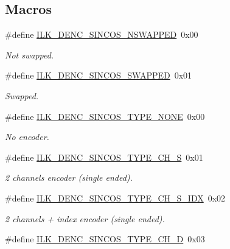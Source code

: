 \subsection*{Macros}
\begin{DoxyCompactItemize}
\item 
\#define \hyperlink{group__IL__CONST__DENC__SINCOS__PARAM_gab022f184ba8cf874ef8721e8abe09c77}{I\+L\+K\+\_\+\+D\+E\+N\+C\+\_\+\+S\+I\+N\+C\+O\+S\+\_\+\+N\+S\+W\+A\+P\+P\+ED}~0x00
\begin{DoxyCompactList}\small\item\em Not swapped. \end{DoxyCompactList}\item 
\#define \hyperlink{group__IL__CONST__DENC__SINCOS__PARAM_ga6dffe9e93f3ca75469f7a06a0c30698e}{I\+L\+K\+\_\+\+D\+E\+N\+C\+\_\+\+S\+I\+N\+C\+O\+S\+\_\+\+S\+W\+A\+P\+P\+ED}~0x01
\begin{DoxyCompactList}\small\item\em Swapped. \end{DoxyCompactList}\item 
\#define \hyperlink{group__IL__CONST__DENC__SINCOS__PARAM_ga41502cd69c22253c445453a996abda64}{I\+L\+K\+\_\+\+D\+E\+N\+C\+\_\+\+S\+I\+N\+C\+O\+S\+\_\+\+T\+Y\+P\+E\+\_\+\+N\+O\+NE}~0x00
\begin{DoxyCompactList}\small\item\em No encoder. \end{DoxyCompactList}\item 
\#define \hyperlink{group__IL__CONST__DENC__SINCOS__PARAM_ga97bc5306fab0925635bf69eb06d5535f}{I\+L\+K\+\_\+\+D\+E\+N\+C\+\_\+\+S\+I\+N\+C\+O\+S\+\_\+\+T\+Y\+P\+E\+\_\+C\+H\+\_\+S}~0x01
\begin{DoxyCompactList}\small\item\em 2 channels encoder (single ended). \end{DoxyCompactList}\item 
\#define \hyperlink{group__IL__CONST__DENC__SINCOS__PARAM_ga8520f2c6591863e2f7edc711b53f459e}{I\+L\+K\+\_\+\+D\+E\+N\+C\+\_\+\+S\+I\+N\+C\+O\+S\+\_\+\+T\+Y\+P\+E\+\_\+C\+H\+\_\+\+S\+\_\+\+I\+DX}~0x02
\begin{DoxyCompactList}\small\item\em 2 channels + index encoder (single ended). \end{DoxyCompactList}\item 
\#define \hyperlink{group__IL__CONST__DENC__SINCOS__PARAM_ga5b8581a8298b5dfd970efed796a73efb}{I\+L\+K\+\_\+\+D\+E\+N\+C\+\_\+\+S\+I\+N\+C\+O\+S\+\_\+\+T\+Y\+P\+E\+\_\+C\+H\+\_\+D}~0x03

\end{DoxyCompactItemize}
